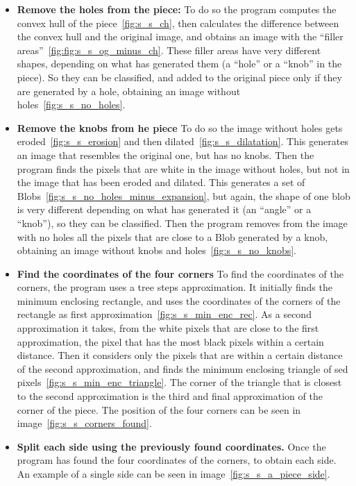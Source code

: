 \documentclass{article}
\begin{document}
\begin{itemize}

  \item \textbf{Remove the holes from the piece:}\newline
  To do so the program computes the convex hull of the piece~\ref{fig:s_s_ch},
  then calculates the difference between the convex hull and the original image,
  and obtains an image with the “filler areas”~\ref{fig:fig:s_s_og_minus_ch}.
  These filler areas have very different shapes,
  depending on what has generated them (a “hole” or a “knob” in the piece).
  So they can be classified, and added to the original piece only if
  they are generated by a hole, obtaining an image without holes~\ref{fig:s_s_no_holes}.

  \item \textbf{Remove the knobs from he piece}\newline
  To do so the image without holes gets eroded~\ref{fig:s_s_erosion} and then dilated~\ref{fig:s_s_dilatation}.
  This generates an image that resembles the original one, but has no knobs.
  Then the program finds the pixels that are white in the image without holes,
  but not in the image that has been eroded and dilated.
  This generates a set of Blobs~\ref{fig:s_s_no_holes_minus_expansion},
  but again, the shape of one blob is very different depending on what has generated it
  (an “angle” or a “knob”), so they can be classified.
  Then the program removes from the image with no holes all the pixels that are
  close to a Blob generated by a knob, obtaining an image without knobs and holes~\ref{fig:s_s_no_knobs}.
  
  \item \textbf{Find the coordinates of the four corners}\newline
  To find the coordinates of the corners, the program uses a tree steps approximation.
  It initially finds the minimum enclosing rectangle,
  and uses the coordinates of the corners of the rectangle
  as first approximation~\ref{fig:s_s_min_enc_rec}.\newline
  As a second approximation it takes,
  from the white pixels that are close to the first approximation,
  the pixel that has the most black pixels within a certain distance.
  Then it considers only the pixels that are within a certain
  distance of the second approximation, and finds the minimum
  enclosing triangle of sed pixels~\ref{fig:s_s_min_enc_triangle}.\newline
  The corner of the triangle that is closest to the second
  approximation is the third and final approximation
  of the corner of the piece.
  The position of the four corners can be seen in image~\ref{fig:s_s_corners_found}.

  \item \textbf{Split each side using the previously found coordinates.}\newline
	Once the program has found the four coordinates of the corners, to obtain each
  side. An example of a single side can be seen in image~\ref{fig:s_s_a_piece_side}.
\end{itemize}
\end{document}
